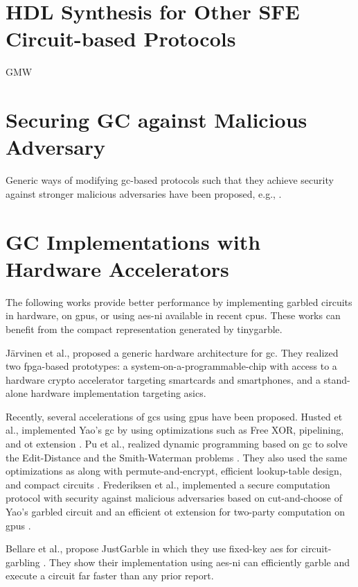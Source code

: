 \section{HDL Synthesis for Other SFE Circuit-based Protocols} \label{sec:related-hdl}
GMW

\section{Securing GC against Malicious Adversary}\label{sec:related-malicious}
Generic ways of modifying \acrshort{gc}-based protocols such that they achieve security against stronger malicious adversaries have been proposed, e.g., \cite{lindell2007efficient, lindell2012secure, nielsen2009lego}.

\section{GC Implementations with Hardware Accelerators} \label{sec:related-hardware}
The following works provide better performance by implementing garbled circuits in hardware, on \acrshort{gpu}s, or using \acrshort{aes-ni} available in recent \acrshort{cpu}s.
These works can benefit from the compact representation generated by \gls{tinygarble}.

J\"arvinen et al., \cite{jarvinen2010garbled} proposed a generic hardware architecture for \acrshort{gc}.
They realized two \acrshort{fpga}-based prototypes: a system-on-a-programmable-chip with access to a hardware crypto accelerator targeting smartcards and smartphones, and a stand-alone hardware implementation targeting \acrshort{asic}s.

Recently, several accelerations of \acrshort{gc}s using \acrshort{gpu}s have been proposed.
Husted et al., implemented Yao's \acrshort{gc} by using optimizations such as Free XOR, pipelining, and \acrshort{ot} extension \cite{husted2013gpu}.
Pu et al., realized dynamic programming based on \acrshort{gc} to solve the Edit-Distance and the Smith-Waterman problems \cite{pu2013computing}.
They also used the same optimizations as \cite{husted2013gpu} along with permute-and-encrypt, efficient lookup-table design, and compact circuits \cite{pu2013computing}.
Frederiksen et al., implemented a secure computation protocol with security against malicious adversaries based on cut-and-choose of Yao's garbled circuit and an efficient \acrshort{ot} extension for two-party computation on \acrshort{gpu}s \cite{frederiksen2013fast}.

Bellare et al., propose JustGarble in which they use fixed-key \acrshort{aes} for circuit-garbling \cite{bellare2013efficient}.
They show their implementation using \acrshort{aes-ni} can efficiently garble and execute a circuit far faster than any prior report.

